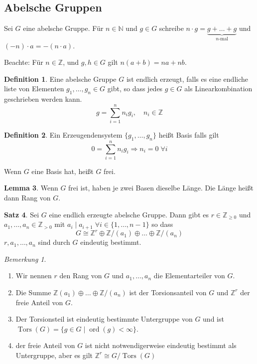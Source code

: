\documentclass[12pt,parskip=full]{scrartcl}
\newcommand{\setN}{\mathbb{N}}
\newcommand{\setZ}{\mathbb{Z}}
\theoremstyle{definition}
\newtheorem{theorem}{Satz}[section]
\newtheorem{lemma}[theorem]{Lemma}
\newtheorem{definition}[theorem]{Definition}
\theoremstyle{remark}
\newtheorem*{remark}{Bemerkung}
\begin{document}
	\subsection{Abelsche Gruppen}
	
	Sei $G$ eine abelsche Gruppe. Für $n \in \setN$ und $g \in G$ schreibe $n \cdot g = \underbrace{g + \dots + g}_{\text{$n$-mal}}$ und $(-n) \cdot a = -(n \cdot a)$.
	
	Beachte: Für $n \in \setZ$, und $g,h \in G$ gilt $n(a + b) = n a + n b$.
	
	\begin{definition}
		Eine abelsche Gruppe $G$ ist endlich erzeugt, falls es eine endliche liste von Elementen $g_1, \dots, g_n \in G$ gibt, so dass jedes $g \in G$ als Linearkombination geschrieben werden kann.
		\begin{equation*}
			g = \sum_{i = 1}^n n_i g_i, \quad n_i \in \setZ
		\end{equation*}
	\end{definition}

	\begin{definition}
		Ein Erzeugendensystem $\{ g_1, \dots, g_n \}$ heißt Basis falls gilt
		\begin{equation*}
			0 = \sum_{i = 1}^n n_i g_i \Rightarrow n_i = 0 \; \forall i
		\end{equation*}
		
		Wenn $G$ eine Basis hat, heißt $G$ frei.
	\end{definition}

	\begin{lemma}
		Wenn $G$ frei ist, haben je zwei Basen dieselbe Länge. Die Länge heißt dann Rang von $G$.
	\end{lemma}

	\begin{theorem}
		Sei $G$ eine endlich erzeugte abelsche Gruppe. Dann gibt es $r \in \setZ_{\geq 0}$ und $a_1, \dots, a_n \in \setZ_{>0}$ mit $a_i \mid a_{i+1} \; \forall i \in \{ 1, \dots, n-1 \}$ so dass
		\begin{equation*}
			G \cong \setZ^r \oplus \setZ/(a_1) \oplus \dots \oplus \setZ/(a_n)
		\end{equation*}
		$r, a_1, \dots, a_n$ sind durch $G$ eindeutig bestimmt.
	\end{theorem}

	\begin{remark}
		\begin{enumerate}
			\item Wir nennen $r$ den Rang von $G$ und $a_1, \dots, a_n$ die Elementarteiler von $G$.
			\item Die Summe $\setZ(a_1) \oplus \dots \oplus \setZ/(a_n)$ ist der Torsionsanteil von $G$ und $\setZ^r$ der freie Anteil von $G$.
			\item Der Torsionsteil ist eindeutig bestimmte Untergruppe von $G$ und ist $\operatorname{Tors}(G) = \{ g \in G \mid \operatorname{ord}(g) < \infty \}$.
			\item der freie Anteil von $G$ ist nicht notwendigerweise eindeutig bestimmt als Untergruppe, aber es gilt $\setZ^r \cong G/\operatorname{Tors}(G)$
		\end{enumerate}
	\end{remark}
\end{document}
